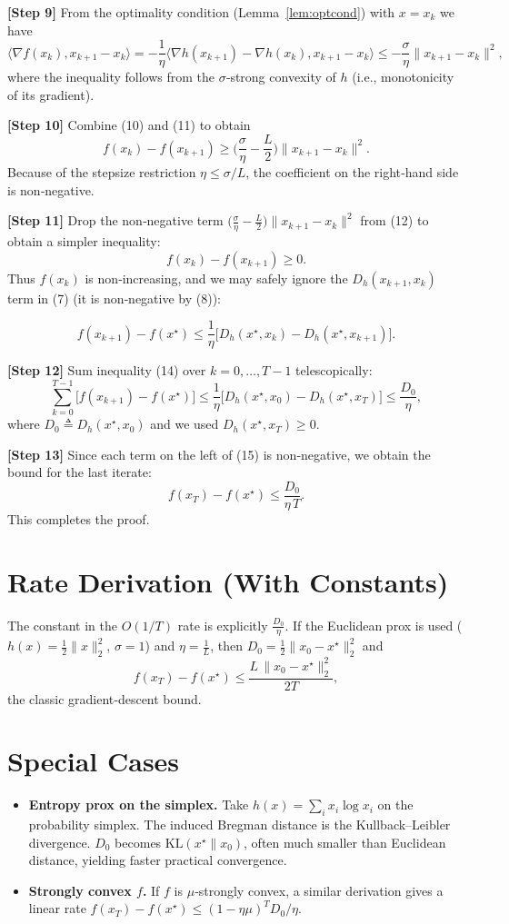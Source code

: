 \documentclass{article}
\newcommand{\inner}[2]{\langle #1,#2\rangle}
\newcommand{\grad}{\nabla}
\newcommand{\Breg}[2]{D_h(#1,#2)}
\begin{document}
\noindent\textbf{[Step 9] } From the optimality condition (Lemma~\ref{lem:optcond}) with $x=x_k$ we have
\[
\inner{\grad f(x_k)}{x_{k+1}-x_k} = -\frac{1}{\eta}\inner{\grad h(x_{k+1})-\grad h(x_k)}{x_{k+1}-x_k}
\le -\frac{\sigma}{\eta}\|x_{k+1}-x_k\|^{2},
\tag{11}
\]
where the inequality follows from the $\sigma$‑strong convexity of $h$ (i.e., monotonicity of its gradient).

\noindent\textbf{[Step 10] } Combine (10) and (11) to obtain
\[
f(x_k)-f(x_{k+1}) \ge \Big(\frac{\sigma}{\eta}-\frac{L}{2}\Big)\|x_{k+1}-x_k\|^{2}.
\tag{12}
\]
Because of the stepsize restriction $\eta\le\sigma/L$, the coefficient on the right‑hand side is non‑negative.

\noindent\textbf{[Step 11] } Drop the non‑negative term $\bigl(\frac{\sigma}{\eta}-\frac{L}{2}\bigr)\|x_{k+1}-x_k\|^{2}$ from (12) to obtain a simpler inequality:
\[
f(x_k)-f(x_{k+1}) \ge 0 .
\tag{13}
\]
Thus $f(x_k)$ is non‑increasing, and we may safely ignore the $\Breg{x_{k+1}}{x_k}$ term in (7) (it is non‑negative by (8)):

\[
f(x_{k+1})-f(x^{\star}) \le \frac{1}{\eta}\bigl[\Breg{x^{\star}}{x_k}-\Breg{x^{\star}}{x_{k+1}}\bigr].
\tag{14}
\]

\noindent\textbf{[Step 12] } Sum inequality (14) over $k=0,\dots,T-1$ telescopically:
\[
\sum_{k=0}^{T-1}\bigl[f(x_{k+1})-f(x^{\star})\bigr]
\le \frac{1}{\eta}\bigl[\Breg{x^{\star}}{x_0}-\Breg{x^{\star}}{x_T}\bigr]
\le \frac{D_{0}}{\eta},
\tag{15}
\]
where $D_{0}\triangleq\Breg{x^{\star}}{x_0}$ and we used $\Breg{x^{\star}}{x_T}\ge0$.

\noindent\textbf{[Step 13] } Since each term on the left of (15) is non‑negative, we obtain the bound for the last iterate:
\[
f(x_T)-f(x^{\star}) \le \frac{D_{0}}{\eta\,T}.
\tag{16}
\]
This completes the proof. \hfill\qedsymbol

\section*{Rate Derivation (With Constants)}
The constant in the $O(1/T)$ rate is explicitly $\frac{D_{0}}{\eta}$.
If the Euclidean prox is used ($h(x)=\frac12\|x\|_{2}^{2}$, $\sigma=1$) and $\eta=\frac{1}{L}$, then $D_{0}=\frac12\|x_0-x^{\star}\|_{2}^{2}$ and
\[
f(x_T)-f(x^{\star})\le \frac{L\,\|x_0-x^{\star}\|_{2}^{2}}{2T},
\]
the classic gradient‑descent bound.

\section*{Special Cases}
\begin{itemize}[leftmargin=*]
\item \textbf{Entropy prox on the simplex.}
Take $h(x)=\sum_{i}x_i\log x_i$ on the probability simplex. The induced Bregman distance is the Kullback–Leibler divergence. $D_{0}$ becomes $\mathrm{KL}(x^{\star}\|x_0)$, often much smaller than Euclidean distance, yielding faster practical convergence.
\item \textbf{Strongly convex $f$.}
If $f$ is $\mu$‑strongly convex, a similar derivation gives a linear rate $f(x_T)-f(x^{\star})\le (1-\eta\mu)^{T}D_{0}/\eta$.
\end{itemize}
\end{document}
